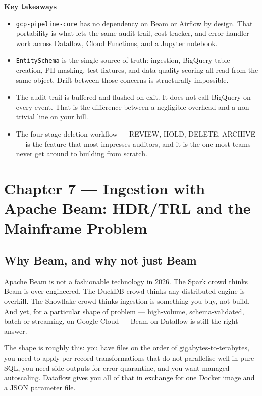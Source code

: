 \documentclass[
  11pt,
  british,
  oneside]{book}
\begin{document}
\begin{takeaways}
\textbf{Key takeaways}
\begin{itemize}
  \item \texttt{gcp-pipeline-core} has no dependency on Beam or Airflow by design. That portability is what lets the same audit trail, cost tracker, and error handler work across Dataflow, Cloud Functions, and a Jupyter notebook.
  \item \texttt{EntitySchema} is the single source of truth: ingestion, BigQuery table creation, PII masking, test fixtures, and data quality scoring all read from the same object. Drift between those concerns is structurally impossible.
  \item The audit trail is buffered and flushed on exit. It does not call BigQuery on every event. That is the difference between a negligible overhead and a non-trivial line on your bill.
  \item The four-stage deletion workflow — REVIEW, HOLD, DELETE, ARCHIVE — is the feature that most impresses auditors, and it is the one most teams never get around to building from scratch.
\end{itemize}
\end{takeaways}

\newpage

\hypertarget{chapter-7-ingestion-with-apache-beam-hdrtrl-and-the-mainframe-problem}{%
\chapter{Chapter 7 --- Ingestion with Apache Beam: HDR/TRL and the
Mainframe
Problem}\label{chapter-7-ingestion-with-apache-beam-hdrtrl-and-the-mainframe-problem}}

\hypertarget{why-beam-and-why-not-just-beam}{%
\section{Why Beam, and why not just
Beam}\label{why-beam-and-why-not-just-beam}}

Apache Beam is not a fashionable technology in 2026. The Spark crowd
thinks Beam is over-engineered. The DuckDB crowd thinks any distributed
engine is overkill. The Snowflake crowd thinks ingestion is something
you buy, not build. And yet, for a particular shape of problem ---
high-volume, schema-validated, batch-or-streaming, on Google Cloud ---
Beam on Dataflow is still the right answer.

The shape is roughly this: you have files on the order of
gigabytes-to-terabytes, you need to apply per-record transformations
that do not parallelise well in pure SQL, you need side outputs for
error quarantine, and you want managed autoscaling. Dataflow gives you
all of that in exchange for one Docker image and a JSON parameter file.
\end{document}
